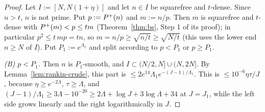 \begin{proof}
Let $I:=[N,N(1+\eta)]$ and let $n\in I$ be squarefree and $t$-dense. Since $n>t$, $n$ is not prime. Put $p:=P^{+}(n)$ and
$m:=n/p$. Then $m$ is squarefree and $t$-dense with $P^{+}(m)<p\le tm$ (Theorem~\ref{thm:bs}, Step 1 of its proof); in
particular $p^2\le t\,mp=tn$, so $m=n/p\ge\sqrt{n/t}\ge\sqrt{N/t}$ (this uses the lower end $n\ge N$ of $I$). Put
$P_1:=e^{\Lambda_1}$ and split according to $p<P_1$ or $p\ge P_1$.

\emph{(B) $p<P_1$.} Then $n$ is $P_1$-smooth, and $I\subset(N/2,N]\cup(N,2N]$. By Lemma~\ref{lem:rankin-crude}, this part is
$\le2e^{14}\Lambda_1e^{-(J-1)/\Lambda_1}$. This is $\le10^{-6}\eta\tau/J$, because $\eta\ge e^{-2\Lambda}$, $\tau\ge\Lambda$, and
$(J-1)/\Lambda_1\ge3\Lambda-10^{-20}\ge2\Lambda+\log J+3\log\Lambda+34$ at $J=J_1$, while the left side grows linearly and the
right logarithmically in $J$.


\end{proof}
